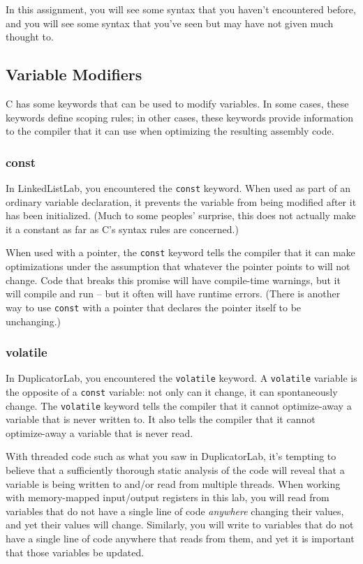 In this assignment, you will see some syntax that you haven't encountered before,
and you will see some syntax that you've seen but  may have not given much thought to.

\subsection{Variable Modifiers}

C has some keywords that can be used to modify variables.
In some cases, these keywords define scoping rules;
in other cases, these keywords provide information to the compiler that it can use when optimizing the resulting assembly code.

\subsubsection{const}

In LinkedListLab, you encountered the \lstinline{const} keyword.
When used as part of an ordinary variable declaration, it prevents the variable from being modified after it has been initialized.
(Much to some peoples' surprise, this does not actually make it a constant as far as C's syntax rules are concerned.)

When used with a pointer, the \lstinline{const} keyword tells the compiler that it can make optimizations under the assumption that whatever the pointer points to will not change.
Code that breaks this promise will have compile-time warnings, but it will compile and run -- but it often will have runtime errors.
(There is another way to use \lstinline{const} with a pointer that declares the pointer itself to be unchanging.)

\subsubsection{volatile}

In DuplicatorLab, you encountered the \lstinline{volatile} keyword.
A \lstinline{volatile} variable is the opposite of a \lstinline{const} variable:
not only can it change, it can spontaneously change.
The \lstinline{volatile} keyword tells the compiler that it cannot optimize-away a variable that is never written to.
It also tells the compiler that it cannot optimize-away a variable that is never read.

With threaded code such as what you saw in DuplicatorLab, it's tempting to believe that a sufficiently thorough static analysis of the code will reveal that a variable is being written to and/or read from multiple threads.
When working with memory-mapped input/output registers in this lab, you will read from variables that do not have a single line of code \textit{anywhere} changing their values, and yet their values will change.
Similarly, you will write to variables that do not have a single line of code anywhere that reads from them, and yet it is important that those variables be updated.

